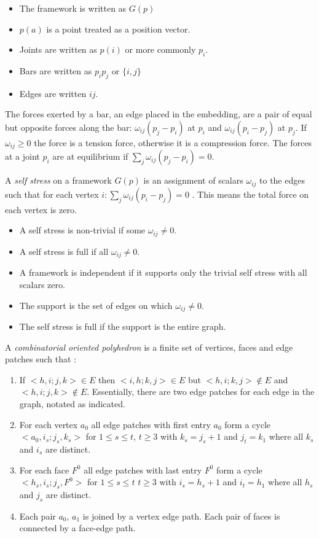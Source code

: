 \documentclass[11pt]{article}
\begin{document}
\begin{itemize}
	\item The framework is written as $G(p)$
	\item $p(a)$ is a point treated as a position vector. 
	\item Joints are written as $p(i)$ or more commonly $p_i$.
	\item Bars are written as $p_ip_j$ or $\{i,j\}$
	\item Edges are written $ij$.
\end{itemize}

The forces exerted by a bar, an edge placed in the embedding, are a pair of equal but opposite forces along the bar: $\omega_{ij}(p_j - p_i)$ at $p_i$ and $\omega_{ij}(p_i - p_j)$ at $p_j$. If $\omega_{ij} \geq 0$ the force is a tension force, otherwise it is a compression force. The forces at a joint $p_i$ are at equilibrium if $\sum_j \omega_{ij}(p_j-p_i) = 0$\cite{mccProof}.

A \emph{self stress} on a framework $G(p)$ is an assignment of scalars $\omega_{ij}$ to the edges such that for each vertex $i : \sum_j \omega_{ij}(p_i - p_j) = 0$ \cite{mccProof}. This means the total force on each vertex is zero. 
\begin{itemize}
	\item A self stress is non-trivial if some $\omega_{ij} \neq 0$.
	\item A self stress is full if all $\omega_{ij} \neq 0$.
	\item A framework is independent if it supports only the trivial self stress with all scalars zero.
	\item The support is the set of edges on which $\omega_{ij} \neq 0$.
	\item The self stress is full if the support is the entire graph.
\end{itemize}

A \emph{combinatorial oriented polyhedron} is a finite set of vertices, faces and edge patches such that \cite{mccProof}:
\begin{enumerate}
	\item If $<h,i;j,k> \in E$ then $<i,h;k,j> \in E$ but $<h,i;k,j> \not\in E$ and $<h,i;j,k> \not\in E$. Essentially, there are two edge patches for each edge in the graph, notated as indicated.
	\item For each vertex $a_0$ all edge patches with first entry $a_0$ form a cycle $<a_0,i_s;j_s,k_s>$ for $1\leq s \leq t$, $t\geq3$ with $k_s = j_s + 1$ and $j_t = k_1$ where all $k_s$ and $i_s$ are distinct. 
	\item For each face $F^0$ all edge patches with last entry $F^0$ form a cycle $<h_s, i_s;j_s,F^0>$ for $1\leq s \leq t$ $t\geq3$ with $i_s = h_s + 1$ and $i_t = h_1$ where all $h_s$ and $j_s$ are distinct.
	\item Each pair $a_0$, $a_1$ is joined by a vertex edge path. Each pair of faces is connected by a face-edge path. 
\end{enumerate}
\end{document}
